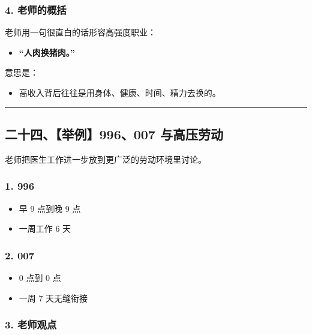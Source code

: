 \documentclass[
  chinese,
  9pt,
  a4paper,
]{ctexart}
\providecommand{\tightlist}{%
  \setlength{\itemsep}{0pt}\setlength{\parskip}{0pt}}
\begin{document}
\subsubsection{4. 老师的概括}\label{ux8001ux5e08ux7684ux6982ux62ec}

老师用一句很直白的话形容高强度职业：

\begin{itemize}
\tightlist
\item
  \textbf{``人肉换猪肉。''}
\end{itemize}

意思是：

\begin{itemize}
\tightlist
\item
  高收入背后往往是用身体、健康、时间、精力去换的。
\end{itemize}

\begin{center}\rule{0.5\linewidth}{0.5pt}\end{center}

\subsection{二十四、【举例】996、007
与高压劳动}\label{ux4e8cux5341ux56dbux4e3eux4f8b996007-ux4e0eux9ad8ux538bux52b3ux52a8}

老师把医生工作进一步放到更广泛的劳动环境里讨论。

\subsubsection{1. 996}\label{section}

\begin{itemize}
\tightlist
\item
  早 9 点到晚 9 点
\item
  一周工作 6 天
\end{itemize}

\subsubsection{2. 007}\label{section-1}

\begin{itemize}
\tightlist
\item
  0 点到 0 点
\item
  一周 7 天无缝衔接
\end{itemize}

\subsubsection{3. 老师观点}\label{ux8001ux5e08ux89c2ux70b9}
\end{document}

